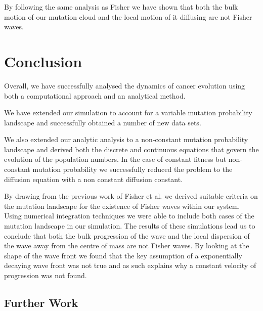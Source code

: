 \documentclass[12pt, a4paper,]{article}
\begin{document}
By following the same analysis as Fisher we have shown that both the bulk motion of our mutation cloud and the local motion of it diffusing are not Fisher waves.  

\newpage



\section{Conclusion}

Overall, we have successfully analysed the dynamics of cancer evolution using both a computational approach and an analytical method. 

We have extended our simulation to account for a variable mutation probability landscape and successfully obtained a number of new data sets.

We also extended our analytic analysis to a non-constant mutation probability landscape and derived both the discrete and continuous equations that govern the evolution of the population numbers. In the case of constant fitness but non-constant mutation probability we successfully reduced the problem to the diffusion equation with a non constant diffusion constant.

By drawing from the previous work of Fisher et al. we derived suitable criteria on the mutation landscape for the existence of Fisher waves within our system. Using numerical integration techniques we were able to include both cases of the mutation landscape in our simulation. The results of these simulations lead us to conclude that both the bulk progression of the wave and the local dispersion of the wave away from the centre of mass are not Fisher waves. By looking at the shape of the wave front we found that the key assumption of a exponentially decaying wave front was not true and as such explains why a constant velocity of progression was not found. 

\subsection{Further Work}

\end{document}
